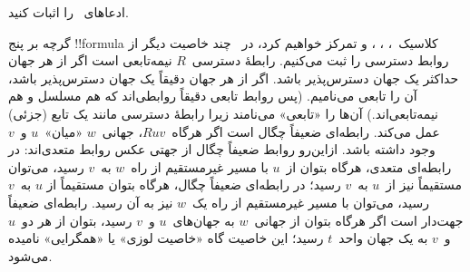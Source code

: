 \documentclass[../../../include/open-logic-section]{subfiles}
\begin{document}
\begin{prob}
  ادعاهای~ را اثبات کنید.
\end{prob}

گرچه بر پنج !!{formula} کلاسیک~، ، ،  و
 تمرکز خواهیم کرد، در~ چند خاصیت دیگر از
روابط دسترسی را ثبت می‌کنیم. رابطهٔ دسترسی~$R$ نیمه‌تابعی است اگر از هر
جهان حداکثر یک جهان دسترس‌پذیر باشد. اگر از هر جهان دقیقاً یک جهان
دسترس‌پذیر باشد، آن را تابعی می‌نامیم. (پس روابط تابعی دقیقاً روابطی‌اند
که هم مسلسل و هم نیمه‌تابعی‌اند.) آن‌ها را «تابعی» می‌نامند زیرا رابطهٔ
دسترسی مانند یک تابع (جزئی) عمل می‌کند. رابطه‌ای ضعیفاً چگال است اگر
هرگاه~$Ruv$، جهانی~$w$ «میان»~$u$ و~$v$ وجود داشته باشد. ازاین‌رو روابط
ضعیفاً چگال از جهتی عکس روابط متعدی‌اند: در رابطه‌ای متعدی، هرگاه بتوان
از~$u$ با مسیر غیرمستقیم از راه~$w$ به~$v$ رسید، می‌توان مستقیماً نیز
از~$u$ به~$v$ رسید؛ در رابطه‌ای ضعیفاً چگال، هرگاه بتوان مستقیماً از
$u$ به~$v$ رسید، می‌توان با مسیر غیرمستقیم از راه یک~$w$ نیز به آن
رسید. رابطه‌ای ضعیفاً جهت‌دار است اگر هرگاه بتوان از جهانی~$w$ به
جهان‌های~$u$ و~$v$ رسید، بتوان از هر دو~$u$ و~$v$ به یک جهان واحد~$t$
رسید؛ این خاصیت گاه «خاصیت لوزی» یا «همگرایی» نامیده می‌شود.
\end{document}
